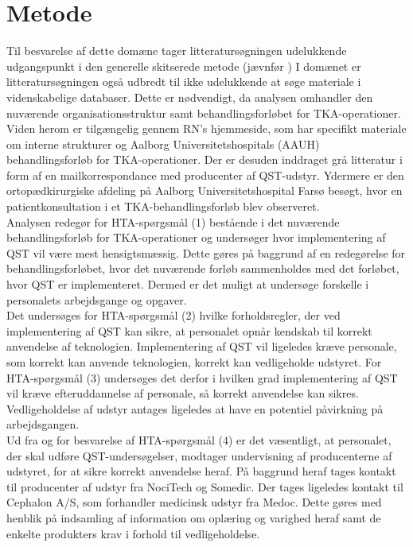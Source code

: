 \section{Metode}
Til besvarelse af dette domæne tager litteratursøgningen udelukkende udgangspunkt i den generelle skitserede metode (jævnfør ) I domænet er litteratursøgningen også udbredt til ikke udelukkende at søge materiale i videnskabelige databaser. Dette er nødvendigt, da analysen omhandler den nuværende organisationsstruktur samt behandlingsforløbet for TKA-operationer. Viden herom er tilgængelig gennem RN’s hjemmeside, som har specifikt materiale om interne strukturer og Aalborg Universitetshospitals (AAUH) behandlingsforløb for TKA-operationer. Der er desuden inddraget grå litteratur i form af en mailkorrespondance med producenter af QST-udstyr. Ydermere er den ortopædkirurgiske afdeling på Aalborg Universitetshospital Farsø besøgt, hvor en patientkonsultation i et TKA-behandlingsforløb blev observeret. \\
Analysen redegør for HTA-spørgsmål (1) bestående i det nuværende behandlingsforløb for TKA-operationer og undersøger hvor implementering af QST vil være mest hensigtsmæssig. Dette gøres på baggrund af en redegørelse for behandlingsforløbet, hvor det nuværende forløb sammenholdes med det forløbet, hvor QST er implementeret. Dermed er det muligt at undersøge forskelle i personalets arbejdsgange og opgaver. \\
Det undersøges for HTA-spørgsmål (2) hvilke forholdsregler, der ved implementering af QST kan sikre, at personalet opnår kendskab til korrekt anvendelse af teknologien.
Implementering af QST vil ligeledes kræve personale, som korrekt kan anvende teknologien, korrekt kan vedligeholde udstyret. For HTA-spørgsmål (3) undersøges det derfor i hvilken grad implementering af QST vil kræve efteruddannelse af personale, så korrekt anvendelse kan sikres. Vedligeholdelse af udstyr antages ligeledes at have en potentiel påvirkning på arbejdsgangen. \\
Ud fra  og for besvarelse af HTA-spørgsmål (4) er det væsentligt, at personalet, der skal udføre QST-undersøgelser, modtager undervisning af producenterne af udstyret, for at sikre korrekt anvendelse heraf. På baggrund heraf tages kontakt til producenter af udstyr fra NociTech og Somedic. Der tages ligeledes kontakt til Cephalon A/S, som forhandler medicinsk udstyr fra Medoc. Dette gøres med henblik på indsamling af information om oplæring og varighed heraf samt de enkelte produkters krav i forhold til vedligeholdelse.

